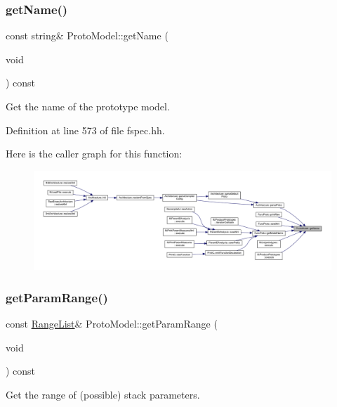 \subsubsection{\texorpdfstring{getName()}{getName()}}
{\footnotesize\ttfamily const string\& Proto\+Model\+::get\+Name (\begin{DoxyParamCaption}\item[{void}]{ }\end{DoxyParamCaption}) const\hspace{0.3cm}{\ttfamily [inline]}}



Get the name of the prototype model. 



Definition at line 573 of file fspec.\+hh.

Here is the caller graph for this function\+:
\nopagebreak
\begin{figure}[H]
\begin{center}
\leavevmode
\includegraphics[width=350pt]{class_proto_model_a19f8d9a9dbc7fb8d52aa180410cddc8b_icgraph}
\end{center}
\end{figure}
\mbox{\label{class_proto_model_a2a83c006b588fad0b0842c6f9862e66b}} 
\subsubsection{\texorpdfstring{getParamRange()}{getParamRange()}}
{\footnotesize\ttfamily const \mbox{\hyperlink{class_range_list}{Range\+List}}\& Proto\+Model\+::get\+Param\+Range (\begin{DoxyParamCaption}\item[{void}]{ }\end{DoxyParamCaption}) const\hspace{0.3cm}{\ttfamily [inline]}}



Get the range of (possible) stack parameters. 



